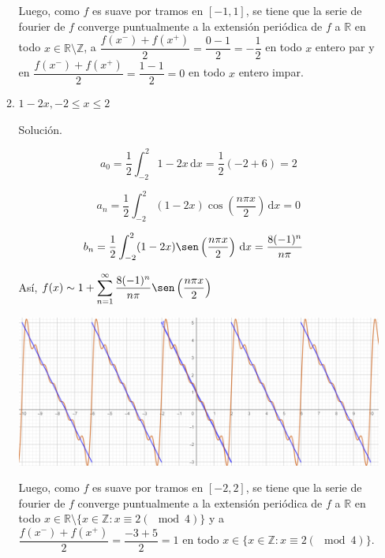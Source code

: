 \documentclass[fleqn]{article}
\newcommand{\real}{\mathbb{R}}
\newcommand{\ent}{\mathbb{Z}}
\newcommand{\intg}[3]{\int_{#1}^{#2} #3 \, \mathrm{d}x}
\begin{document}
\begin{enumerate}[I.]
\begin{enumerate}[(1)]
			Luego, como $f$ es suave por tramos en $ [-1,1] $, se tiene que la serie de fourier de $f$ converge puntualmente a la extensión periódica de $f$ a $ \real $ en todo $ x \in \real \setminus \ent $, a $ \dfrac{f(x^-) + f(x^+)}{2} = \dfrac{0-1}{2} = -\dfrac{1}{2} $ en todo $ x $ entero par y en $ \dfrac{f(x^-) + f(x^+)}{2} = \dfrac{1-1}{2} = 0 $ en todo $ x $ entero impar.

			\bfseries
			\item $ 1 - 2x, -2 \leq x \leq 2 $
			
			Solución.

			\normalfont

			\begin{equation*}
				a_0 = \dfrac{1}{2} \intg{-2}{2}{1 - 2x} = \dfrac{1}{2} (-2 + 6) = 2
			\end{equation*}

			\begin{equation*}
				a_n = \dfrac{1}{2} \intg{-2}{2}{(1 - 2x) \cos \left( \dfrac{n \pi x}{2} \right)} = 0
			\end{equation*}

			\begin{align*}
				b_n &= \dfrac{1}{2} \intg{-2}{2}{(1 - 2x) \sen \left( \dfrac{n \pi x}{2} \right)} = \dfrac{8(-1)^n}{n \pi}
			\end{align*}

			Así, $ \displaystyle f(x) \sim 1 + \sum_{n=1}^{\infty} \dfrac{8(-1)^n}{n \pi} \sen \left( \dfrac{n \pi x}{2} \right) $

			\includegraphics[width=\linewidth]{Ejer3.png}

			Luego, como $f$ es suave por tramos en $ [-2,2] $, se tiene que la serie de fourier de $f$ converge puntualmente a la extensión periódica de $f$ a $ \real $ en todo $ x \in \real \setminus \{ x \in \ent \colon x \equiv 2 (\! \mod 4) \} $ y a $ \dfrac{f(x^-) + f(x^+)}{2} = \dfrac{-3+5}{2} = 1 $ en todo $ x \in \{ x \in \ent \colon x \equiv 2 (\! \mod 4) \} $.


\end{enumerate}
\end{enumerate}
\end{document}
